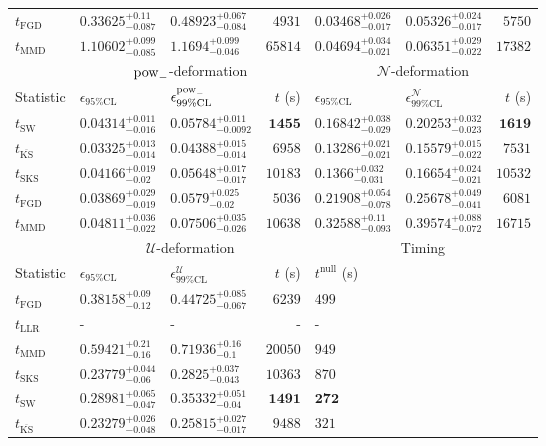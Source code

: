 \begin{tabular}{l|llr|llr}
	$t_{\mathrm{FGD}}$ & ${\mathbf{0.33625_{-0.087}^{+0.11}}}$ & ${\mathbf{0.48923_{-0.084}^{+0.067}}}$ & $4931$ & ${\mathbf{0.03468_{-0.017}^{+0.026}}}$ & $0.05326_{-0.017}^{+0.024}$ & $5750$ \\
	$t_{\mathrm{MMD}}$ & $1.10602_{-0.085}^{+0.099}$ & $1.1694_{-0.046}^{+0.099}$ & $65814$ & $0.04694_{-0.021}^{+0.034}$ & $0.06351_{-0.022}^{+0.029}$ & $17382$ \\
	\toprule
	\multicolumn{1}{c}{} & \multicolumn{3}{c}{$\rm{pow}_{-}$-deformation} & \multicolumn{3}{c}{$\mathcal{N}$-deformation} \\
	Statistic & $\epsilon_{95\%\mathrm{CL}}$ & $\epsilon^  {\rm{pow}_{-}}_{99\%\mathrm{CL}}$ & $t$ (s) & $\epsilon_{95\%\mathrm{CL}}$ & $\epsilon^    {\mathcal{N}}_{99\%\mathrm{CL}}$ & $t$ (s) \\
	\midrule
	$t_{\mathrm{SW}}$ & $0.04314_{-0.016}^{+0.011}$ & $0.05784_{-0.0092}^{+0.011}$ & ${\mathbf{1455}}$ & $0.16842_{-0.029}^{+0.038}$ & $0.20253_{-0.023}^{+0.032}$ & ${\mathbf{1619}}$ \\
	$t_{\overline{\mathrm{KS}}}$ & ${\mathbf{0.03325_{-0.014}^{+0.013}}}$ & ${\mathbf{0.04388_{-0.014}^{+0.015}}}$ & $6958$ & ${\mathbf{0.13286_{-0.021}^{+0.021}}}$ & ${\mathbf{0.15579_{-0.022}^{+0.015}}}$ & $7531$ \\
	$t_{\mathrm{SKS}}$ & $0.04166_{-0.02}^{+0.019}$ & $0.05648_{-0.017}^{+0.017}$ & $10183$ & $0.1366_{-0.031}^{+0.032}$ & $0.16654_{-0.021}^{+0.024}$ & $10532$ \\
	$t_{\mathrm{FGD}}$ & $0.03869_{-0.019}^{+0.029}$ & $0.0579_{-0.02}^{+0.025}$ & $5036$ & $0.21908_{-0.078}^{+0.054}$ & $0.25678_{-0.041}^{+0.049}$ & $6081$ \\
	$t_{\mathrm{MMD}}$ & $0.04811_{-0.022}^{+0.036}$ & $0.07506_{-0.026}^{+0.035}$ & $10638$ & $0.32588_{-0.093}^{+0.11}$ & $0.39574_{-0.072}^{+0.088}$ & $16715$ \\
	\toprule
	\multicolumn{1}{c}{} & \multicolumn{3}{c}{$\mathcal{U}$-deformation} & \multicolumn{3}{c}{Timing} \\
	Statistic & $\epsilon_{95\%\mathrm{CL}}$ & $\epsilon^    {\mathcal{U}}_{99\%\mathrm{CL}}$ & $t$ (s) & $t^{\mathrm{null}}$ (s) \\
	\midrule
	$t_{\mathrm{FGD}}$ & $0.38158_{-0.12}^{+0.09}$ & $0.44725_{-0.067}^{+0.085}$ & $6239$ & $499$ \\
	$t_{\mathrm{LLR}}$ & - & - & - & - \\
	$t_{\mathrm{MMD}}$ & $0.59421_{-0.16}^{+0.21}$ & $0.71936_{-0.1}^{+0.16}$ & $20050$ & $949$ \\
	$t_{\mathrm{SKS}}$ & $0.23779_{-0.06}^{+0.044}$ & $0.2825_{-0.043}^{+0.037}$ & $10363$ & $870$ \\
	$t_{\mathrm{SW}}$ & $0.28981_{-0.047}^{+0.065}$ & $0.35332_{-0.04}^{+0.051}$ & ${\mathbf{1491}}$ & ${\mathbf{272}}$ \\
	$t_{\overline{\mathrm{KS}}}$ & ${\mathbf{0.23279_{-0.048}^{+0.026}}}$ & ${\mathbf{0.25815_{-0.017}^{+0.027}}}$ & $9488$ & $321$ \\
	\bottomrule
\end{tabular}